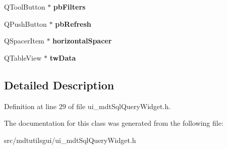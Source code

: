 \begin{DoxyCompactItemize}
\item 
\hypertarget{class_ui__mdt_sql_query_widget_a87b20818afed1b534eb6d872044a953b}{
QToolButton $\ast$ {\bfseries pbFilters}}
\label{class_ui__mdt_sql_query_widget_a87b20818afed1b534eb6d872044a953b}

\item 
\hypertarget{class_ui__mdt_sql_query_widget_a117cc61c4f8ab6342e54479353cf333b}{
QPushButton $\ast$ {\bfseries pbRefresh}}
\label{class_ui__mdt_sql_query_widget_a117cc61c4f8ab6342e54479353cf333b}

\item 
\hypertarget{class_ui__mdt_sql_query_widget_a78a8f55b56a47d05cd233c960c28b8d7}{
QSpacerItem $\ast$ {\bfseries horizontalSpacer}}
\label{class_ui__mdt_sql_query_widget_a78a8f55b56a47d05cd233c960c28b8d7}

\item 
\hypertarget{class_ui__mdt_sql_query_widget_adfcef96e9d51747e123ae65ffa30e2b7}{
QTableView $\ast$ {\bfseries twData}}
\label{class_ui__mdt_sql_query_widget_adfcef96e9d51747e123ae65ffa30e2b7}

\end{DoxyCompactItemize}


\subsection{Detailed Description}


Definition at line 29 of file ui\_\-mdtSqlQueryWidget.h.



The documentation for this class was generated from the following file:\begin{DoxyCompactItemize}
\item 
src/mdtutilsgui/ui\_\-mdtSqlQueryWidget.h\end{DoxyCompactItemize}
